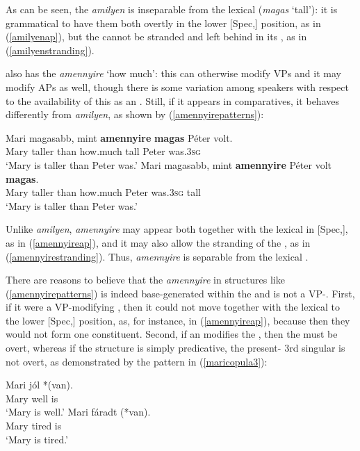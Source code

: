 As can be seen, the  \textit{amilyen} is inseparable from the lexical  (\textit{magas} `tall'): it is grammatical to have them both overtly in the lower [Spec,] position, as in (\ref{amilyenap}), but the  cannot be stranded and left behind in its , as in (\ref{amilyenstranding}).

 also has the  \textit{amennyire} `how much': this can otherwise modify VPs and it may modify APs as well, though there is some variation among speakers with respect to the availability of this  as an  . Still, if it appears in comparatives, it behaves differently from \textit{amilyen}, as shown by (\ref{amennyirepatterns}):

\ea \label{amennyirepatterns}
\ea	\gll Mari	magasabb,	mint \textbf{amennyire} \textbf{magas} Péter volt. \label{amennyireap}\\
Mary taller	than how.much	tall Peter was.\textsc{3sg}\\
\glt `Mary is taller than Peter was.'
\ex	\gll Mari magasabb, mint \textbf{amennyire} Péter volt \textbf{magas}. \label{amennyirestranding}\\
Mary taller	than how.much Peter was.\textsc{3sg} tall\\
\glt `Mary is taller than Peter was.'
\z
\z

Unlike \textit{amilyen}, \textit{amennyire} may appear both together with the lexical  in [Spec,], as in (\ref{amennyireap}), and it may also allow the stranding of the , as in (\ref{amennyirestranding}). Thus, \textit{amennyire} is separable from the lexical .

There are reasons to believe that the  \textit{amennyire} in structures like (\ref{amennyirepatterns}) is indeed base-generated within the  and is not a VP-. First, if it were a VP-modifying , then it could not move together with the lexical  to the lower [Spec,] position, as, for instance, in (\ref{amennyireap}), because then they would not form one constituent. Second, if an  modifies the , then the  must be overt, whereas if the structure is simply predicative, the present- 3rd singular  is not overt, as demonstrated by the pattern in (\ref{maricopula3}):

\ea \label{maricopula3}
\ea \gll Mari	jól	*(van).\\
Mary well \phantom{*(}is\\
\glt `Mary is well.'
\ex \gll Mari fáradt (*van).\\
Mary tired \phantom{*(}is\\
\glt `Mary is tired.'
\z
\z

